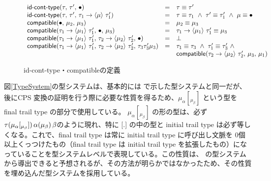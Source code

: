 \begin{figure}[h]
\[
\begin{array}{lcl}
  \IsIdTrail{\tau}{\tau'}{\Bullet} & = & \tau \equiv \tau' \\
  \IsIdTrail{\tau}{\tau'}{\Trail{\tau_1}{\tau_1'}{\mu}} & = &
   \tau \equiv \tau_1\ \wedge\ \tau' \equiv \tau_1'\ \wedge\ \mu \equiv \Bullet \\

  \Compatible{\Bullet}{\mu_2}{\mu_3}
  & = & \mu_2 \equiv \mu_3\\
\Compatible{\Trail{\tau_1}{\tau_1'}{\mu_1}}{\Bullet}{\mu_3}
  & = & \Trail{\tau_1}{\tau_1'}{\mu_1} \equiv \mu_3\\
\Compatible{\Trail{\tau_1}{\tau_1'}{\mu_1}}
           {\Trail{\tau_2}{\tau_2'}{\mu_2}}{\Bullet}
  & = & \bot \\
\Compatible{\Trail{\tau_1}{\tau_1'}{\mu_1}}
           {\Trail{\tau_2}{\tau_2'}{\mu_2}}
           {{\tau_3}{\tau_3'}{\mu_3}}
  & = & \tau_1 \equiv \tau_3\ \wedge\ \tau_1' \equiv \tau_3'\ \wedge\\ 
  &   & \Compatible{\Trail{\tau_2}{\tau_2'}{\mu_2}}{\mu_3}{\mu_1}
\end{array}
\]
\caption{\textsf{id-cont-type}・\textsf{compatible}の定義}
\label{IsidCompatible}
\end{figure}

図\ref{TypeSystem}の型システムは、基本的には \cite{FSCD2021} で示した型システムと同一だが、後にCPS 変換の証明を行う際に必要な性質を得るため、$\mu_{\alpha}[_{\mu_{\beta}}]$ という型を final trail type の部分で使用している。%
%
%
$\mu_{\alpha}[_{\mu_{\beta}}]$ の形の型は、必ず$\tau (\mu_{\alpha}\lbrack \tiny{_{\mu_{\beta}}} \rbrack)\,\alpha(\mu_{\beta})\,\beta$のように現れ、特に [.] の中の型と initial trail type は必ず等しくなる。これで、final trail type は常に initial trail type に呼び出し文脈を 0個以上くっつけたもの（final trail type は initial trail type を拡張したもの）になっていることを型システムレベルで表現している。この性質は、\cite{FSCD2021} の型システムから導出できると予想されるが、その方法が明らかではなかったため、その性質を埋め込んだ型システムを採用している。

